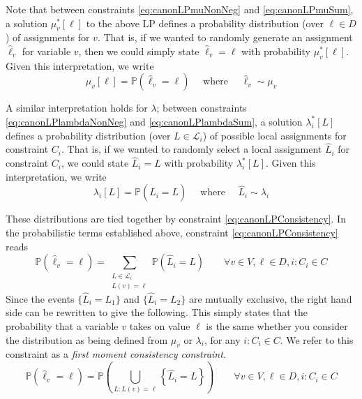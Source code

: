 Note that between constraints \ref{eq:canonLPmuNonNeg} and \ref{eq:canonLPmuSum}, a solution $\mu^*_v[\ell]$ to the above LP defines a probability distribution (over $\ell \in D$) of assignments for $v$. That is, if we wanted to randomly generate an assignment $\hat{\ell}_v$ for variable $v$, then we could simply state $\hat{\ell}_v = \ell$ with probability $\mu^*_v[\ell]$. Given this interpretation, we write
\begin{equation}
\mu_v[\ell] = \mathbb{P}\left( \hat{\ell}_v = \ell \right) \quad \text{ where } \quad \hat{\ell}_v \sim \mu_v 
\end{equation}

A similar interpretation holds for $\lambda$; between constraints \ref{eq:canonLPlambdaNonNeg} and \ref{eq:canonLPlambdaSum}, a solution $\lambda^*_i[L]$ defines a probability distribution (over $L \in \mathcal{L}_i$) of possible local assignments for constraint $C_i$. That is, if we wanted to randomly select a local  assignment $\hat{L}_i$ for constraint $C_i$, we could state $\hat{L}_i = L$ with probability $\lambda^*_i[L]$. Given this interpretation, we write
\begin{equation}
\lambda_i[L] = \mathbb{P}\left( \hat{L}_i = L \right) \quad \text{ where } \quad \hat{L}_i \sim \lambda_i 
\end{equation}
  
These distributions are tied together by constraint \ref{eq:canonLPConsistency}. In the probabilistic terms established above, constraint \ref{eq:canonLPConsistency} reads
\begin{equation}
\mathbb{P}\left( \hat{\ell}_v = \ell \right) = \sum_{\substack{L \in \mathcal{L}_i \\ L(v) = \ell}} \mathbb{P}\left( \hat{L}_i = L \right) \qquad \forall v \in V, \ell \in D, i : C_i \in C
\end{equation}
Since the events  $\{\hat{L}_i = L_1 \}$ and $\{\hat{L}_i = L_2 \}$ are mutually exclusive, the right hand side can be rewritten to give the following. This simply states that the probability that a variable $v$ takes on value $\ell$ is the same whether you consider the distribution as being defined from $\mu_v$ or $\lambda_i$, for any $i : C_i \in C$. We refer to this constraint as a \textit{first moment consistency constraint}.
\begin{equation} 
\mathbb{P}\left( \hat{\ell}_v = \ell \right) = \mathbb{P}\left( \bigcup_{L : L(v) =  \ell} \left\{\hat{L}_i = L\right\} \right) \qquad \forall v \in V, \ell \in D, i : C_i \in C
\end{equation}

